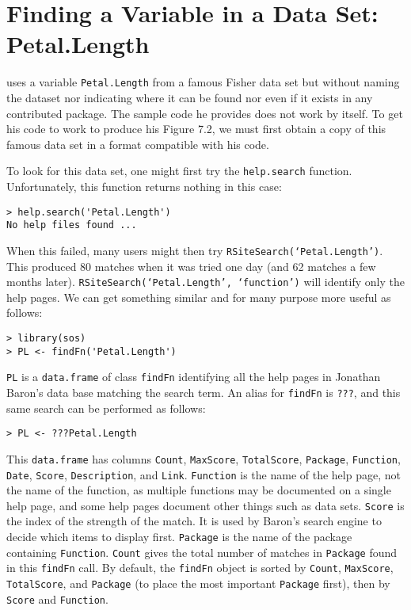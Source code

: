 \section*{Finding a Variable in a Data Set:  Petal.Length}

\citet[pp. 282-283]{JC09} uses a variable {\tt Petal.Length} from a
famous Fisher data set but without naming the dataset nor indicating
where it can be found nor even if it exists in any contributed \R{}
package.  The sample code he provides does not work by itself.  To get
his code to  work to produce his Figure 7.2, we must first obtain a
copy of this famous data set in a format compatible with his code.

To look for this data set, one might first try
the {\tt help.search} function.  Unfortunately, this function
returns nothing in this case:
\begin{verbatim}
> help.search('Petal.Length')
No help files found ...
\end{verbatim}
When this failed, many users might then try
{\tt RSiteSearch(`Petal.Length')}.  This produced 80 matches
when it was tried one day (and 62 matches a few months later).
{\tt RSiteSearch(`Petal.Length', `function')} will identify
only the help pages.  We can get something similar and for
many purpose more useful as follows:
\begin{verbatim}
> library(sos)
> PL <- findFn('Petal.Length')
\end{verbatim}
{\tt PL} is a {\tt data.frame} of class {\tt findFn} identifying
all the help pages in Jonathan Baron's data base matching the
search term.  An alias for {\tt findFn} is {\tt ???}, and this same
search can be performed as follows:
\begin{verbatim}
> PL <- ???Petal.Length
\end{verbatim}
This {\tt data.frame} has columns {\tt Count},
{\tt MaxScore}, {\tt TotalScore}, {\tt Package}, {\tt Function},
{\tt Date}, {\tt Score}, {\tt Description}, and {\tt Link}.
{\tt Function} is the name of the help page, not the name of the
function, as multiple functions may be documented on a single
help page, and some help pages document other things such as data
sets.  {\tt Score} is the index of the strength of the match.  It is used
by Baron's search engine to decide which items to display first.
{\tt Package} is the name of the package containing {\tt Function}.
{\tt Count} gives the total number of matches in {\tt Package} found in this
{\tt findFn} call.  By default, the {\tt findFn} object is sorted by {\tt Count}, {\tt MaxScore}, {\tt TotalScore},
and {\tt Package} (to place the most important {\tt Package}
first), then by {\tt Score} and {\tt Function}.

